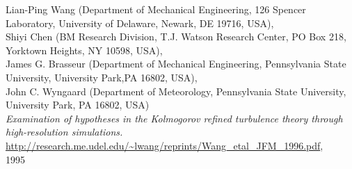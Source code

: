 \documentclass[12pt,a4paper]{article}
\numberwithin{equation}{section}
\begin{document}
\begin{thebibliography}{11}
  Lian-Ping Wang (Department of Mechanical Engineering, 126 Spencer Laboratory, University of Delaware, Newark, DE 19716, USA),\\
 Shiyi Chen (BM Research Division, T.J. Watson Research Center, PO Box 218, Yorktown Heights,
NY 10598, USA), \\
James G. Brasseur (Department of Mechanical Engineering, Pennsylvania State University, University Park,PA 16802, USA),\\
John C. Wyngaard (Department of Meteorology, Pennsylvania State University, University Park, PA 16802, USA) \\
  \emph{Examination of hypotheses in the Kolmogorov
refined turbulence theory through
high-resolution simulations. }
  \url{http://research.me.udel.edu/~lwang/reprints/Wang_etal_JFM_1996.pdf}, \\
  1995
  
\end{thebibliography}
\end{document}
